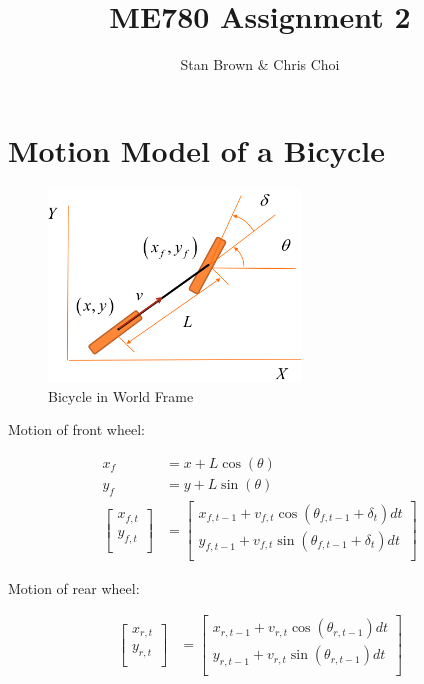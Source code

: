 \documentclass{article}
\begin{document}
\title{ME780 Assignment 2}
\author{Stan Brown \& Chris Choi}
\date{}
\maketitle

\section{Motion Model of a Bicycle}

\begin{figure}[H]
	\centering
	\includegraphics[width=0.6\textwidth]{images/bicycle_model.png}
	\caption{Bicycle in World Frame}
	\label{fig:bicycle}
\end{figure}

Motion of front wheel:

\begin{align}
	x_{f} &= x + L \cos(\theta) \\
	y_{f} &= y + L \sin(\theta) \\
 	\begin{bmatrix}
        x_{f, t} \\
        y_{f, t} \\
    \end{bmatrix}  
    &=
    \begin{bmatrix}
	    x_{f, t - 1} + v_{f, t} \cos(\theta_{f, t - 1} + \delta_{t}) dt \\
		y_{f, t - 1} + v_{f, t} \sin(\theta_{f, t - 1} + \delta_{t}) dt \\
    \end{bmatrix}
\end{align}

Motion of rear wheel:

\begin{align}
 	\begin{bmatrix}
        x_{r, t} \\
        y_{r, t} \\
    \end{bmatrix}  
    &=
    \begin{bmatrix}
	    x_{r, t - 1} + v_{r, t} \cos(\theta_{r, t - 1}) dt \\
		y_{r, t - 1} + v_{r, t} \sin(\theta_{r, t - 1}) dt \\
    \end{bmatrix}
\end{align}
\end{document}
